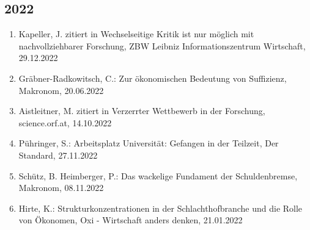\subsection*{2022}
\begin{enumerate}
	 \item Kapeller, J. zitiert in Wechselseitige Kritik ist nur möglich mit nachvollziehbarer Forschung, ZBW Leibniz Informationszentrum Wirtschaft, 29.12.2022
	 \item Gräbner-Radkowitsch, C.: Zur ökonomischen Bedeutung von Suffizienz, Makronom, 20.06.2022
	 \item Aistleitner, M. zitiert in Verzerrter Wettbewerb in der Forschung, science.orf.at, 14.10.2022
	 \item Pühringer, S.: Arbeitsplatz Universität: Gefangen in der Teilzeit, Der Standard, 27.11.2022
	 \item Schütz, B. Heimberger, P.: Das wackelige Fundament der Schuldenbremse, Makronom, 08.11.2022
	 \item Hirte, K.: Strukturkonzentrationen in der Schlachthofbranche und die Rolle von Ökonomen, Oxi - Wirtschaft anders denken, 21.01.2022
\end{enumerate}
